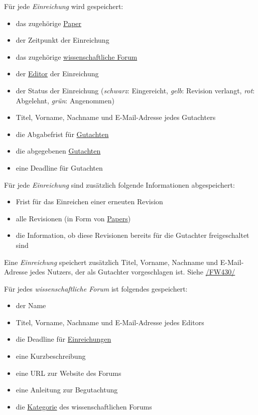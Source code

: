 \begin{description}
	 Für jede \emph{Einreichung} wird gespeichert:
	\begin{itemize}
		\item das zugehörige \hyperref[d020]{Paper}
		\item der Zeitpunkt der Einreichung
		\item das zugehörige \hyperref[d030]{wissenschaftliche Forum}
		\item der \hyperref[funkt:editor]{Editor} der Einreichung
		\item der Status der Einreichung (\emph{schwarz}: Eingereicht, \emph{gelb}: Revision verlangt, \emph{rot}: Abgelehnt, \emph{grün}: Angenommen)
		\item Titel, Vorname, Nachname und E-Mail-Adresse jedes Gutachters
		\item die Abgabefrist für \hyperref[d040]{Gutachten}
		\item die abgegebenen \hyperref[d040]{Gutachten}
		\item eine Deadline für Gutachten
	\end{itemize}

	 Für jede \emph{Einreichung} sind zusätzlich folgende Informationen abgespeichert:
	\begin{itemize}
		\item Frist für das Einreichen einer erneuten Revision
		\item alle Revisionen (in Form von \hyperref[d020]{Papers})
		\item die Information, ob diese Revisionen bereits für die Gutachter freigeschaltet sind
	\end{itemize}

	 Eine \emph{Einreichung} speichert zusätzlich Titel, Vorname, Nachname und E-Mail-Adresse jedes Nutzers, der als Gutachter vorgeschlagen ist.
	Siehe \hyperref[funkt:430]{/FW430/}

	 Für jedes \emph{wissenschaftliche Forum} ist folgendes gespeichert:
	\begin{itemize}
		\item der Name
		\item Titel, Vorname, Nachname und E-Mail-Adresse jedes Editors
		\item die Deadline für \hyperref[d025]{Einreichungen}
		\item eine Kurzbeschreibung
		\item eine URL zur Website des Forums
		\item eine Anleitung zur Begutachtung
		\item die \hyperref[d035]{Kategorie} des wissenschaftlichen Forums
	\end{itemize}


\end{description}

